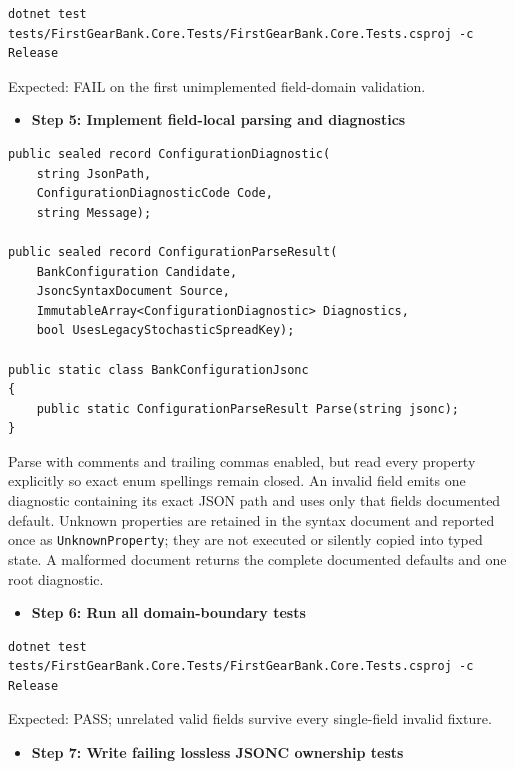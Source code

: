 \documentclass[
  10pt,
  letterpaper,
]{article}
\newcommand{\passthrough}[1]{#1}
\providecommand{\tightlist}{%
  \setlength{\itemsep}{0pt}\setlength{\parskip}{0pt}}
\begin{document}
\begin{lstlisting}
dotnet test tests/FirstGearBank.Core.Tests/FirstGearBank.Core.Tests.csproj -c Release
\end{lstlisting}

Expected: FAIL on the first unimplemented field-domain validation.

\begin{itemize}
\tightlist
\item[$\square$]
  \textbf{Step 5: Implement field-local parsing and diagnostics}
\end{itemize}

\begin{lstlisting}
public sealed record ConfigurationDiagnostic(
    string JsonPath,
    ConfigurationDiagnosticCode Code,
    string Message);

public sealed record ConfigurationParseResult(
    BankConfiguration Candidate,
    JsoncSyntaxDocument Source,
    ImmutableArray<ConfigurationDiagnostic> Diagnostics,
    bool UsesLegacyStochasticSpreadKey);

public static class BankConfigurationJsonc
{
    public static ConfigurationParseResult Parse(string jsonc);
}
\end{lstlisting}

Parse with comments and trailing commas enabled, but read every property
explicitly so exact enum spellings remain closed. An invalid field emits
one diagnostic containing its exact JSON path and uses only that
field\textquotesingle s documented default. Unknown properties are
retained in the syntax document and reported once as
\passthrough{\lstinline!UnknownProperty!}; they are not executed or
silently copied into typed state. A malformed document returns the
complete documented defaults and one root diagnostic.

\begin{itemize}
\tightlist
\item[$\square$]
  \textbf{Step 6: Run all domain-boundary tests}
\end{itemize}

\begin{lstlisting}
dotnet test tests/FirstGearBank.Core.Tests/FirstGearBank.Core.Tests.csproj -c Release
\end{lstlisting}

Expected: PASS; unrelated valid fields survive every single-field
invalid fixture.

\begin{itemize}
\tightlist
\item[$\square$]
  \textbf{Step 7: Write failing lossless JSONC ownership tests}
\end{itemize}
\end{document}
